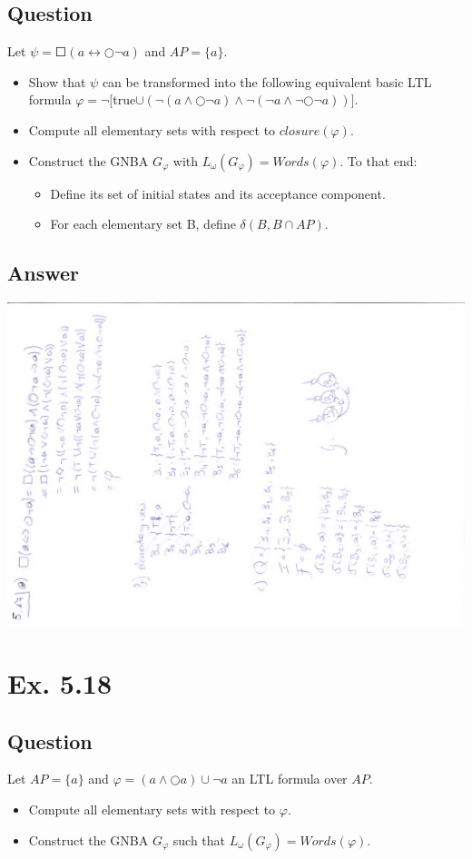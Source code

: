 \documentclass[12pt]{article}
\begin{document}
\subsection*{Question}
Let $\psi = \Square (a \leftrightarrow \Circle \neg a)$ and $AP = \{a\}$.
\begin{itemize}
	\item Show that $\psi$ can be transformed into the following equivalent basic LTL formula
	$\varphi = \neg [$true$\cup(\neg(a\wedge\Circle\neg a)\wedge\neg(\neg a\wedge\neg\Circle\neg a))]$.
	\item Compute all elementary sets with respect to $closure(\varphi)$.
	\item Construct the GNBA $G_\varphi$ with $L_\omega(G_\varphi) = Words(\varphi)$. To that end:
		\begin{itemize}
			\item Define its set of initial states and its acceptance component.
			\item For each elementary set B, define $\delta(B,B\cap AP)$.
		\end{itemize}
\end{itemize}

\subsection*{Answer}
\includegraphics*[angle=270, scale=0.7]{ex517.pdf}

\newpage
\section*{Ex. 5.18}
\subsection*{Question}
Let $AP = \{a\}$ and $\varphi = (a\wedge\Circle a)\cup\neg a$ an LTL formula over $AP$.
\begin{itemize}
	\item Compute all elementary sets with respect to $\varphi$.
	\item Construct the GNBA $G_\varphi$ such that $L_\omega(G_\varphi) = Words(\varphi)$.
\end{itemize}
\end{document}
